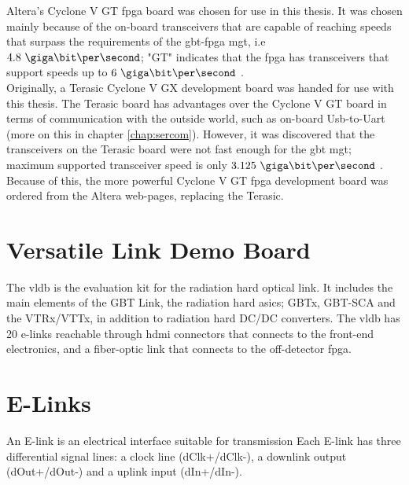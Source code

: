 \documentclass[main.tex]{subfiles}
\begin{document}
Altera's Cyclone V GT \gls{fpga} board was chosen for use in this thesis. It was chosen mainly because of the on-board transceivers that are capable of reaching speeds that surpass the requirements of the \gls{gbt}-\gls{fpga} \gls{mgt}, i.e $4.8~\giga\bit\per\second$; "GT" indicates that the \gls{fpga} has transceivers that support speeds up to $6~\giga\bit\per\second$ \cite{altera_cvoverview15}.\\
Originally, a Terasic Cyclone V GX development board was handed for use with this thesis. The Terasic board has advantages over the Cyclone V GT board in terms of communication with the outside world, such as on-board Usb-to-Uart (more on this  in chapter \ref{chap:sercom}). However, it was discovered that the transceivers on the Terasic board were not fast enough for the \gls{gbt} \gls{mgt}; maximum supported transceiver speed is only $3.125~\giga\bit\per\second$ \cite{altera_cvoverview15}. Because of this, the more powerful Cyclone V GT \gls{fpga} development board was ordered from the Altera web-pages, replacing the Terasic.

\section{Versatile Link Demo Board}

The \gls{vldb} is the evaluation kit for the radiation hard optical link. It includes the main elements of the GBT Link, the radiation hard \glspl{asic}; GBTx, GBT-SCA and the VTRx/VTTx, in addition to radiation hard DC/DC converters. The \gls{vldb} has 20 e-links reachable through \gls{hdmi} connectors that connects to the front-end electronics, and a fiber-optic link that connects to the off-detector \gls{fpga}.\\

\section{E-Links}
An E-link is an electrical interface suitable for transmission
Each E-link has three differential signal lines: a clock line (dClk+/dClk-), a downlink output (dOut+/dOut-) and a uplink input (dIn+/dIn-).
\end{document}
